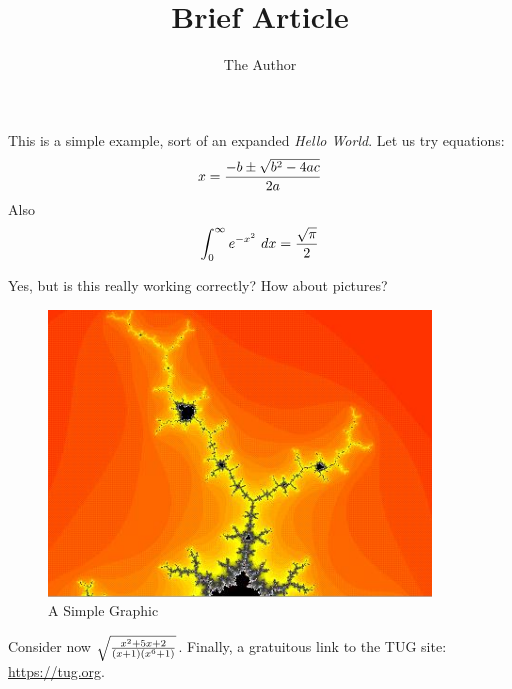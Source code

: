 \documentclass[11pt, oneside]{article}   	%
\title{Brief Article}
\author{The Author}
\begin{document}
\maketitle
This is a simple example, sort of an expanded {\em Hello World}.
Let us try equations: 
$$x = {{- b \pm \sqrt{b^2 - 4 ac}} \over {2a}}$$
Also
$$\int_0^\infty e^{- x^2} \ dx = {{\sqrt{\pi}} \over 2}$$

Yes, but is this really working correctly? How about pictures?

\begin{figure}[htbp] %
   \centering
   \includegraphics[width=4in]{topdot.jpg} 
   \caption{A Simple Graphic}
\end{figure}

Consider now $\sqrt{ {{x^2 + 5 x + 2} \over {(x + 1)(x^6 + 1)}}}$.  Finally, a gratuitous link to the TUG site: \url{https://tug.org}.
\end{document}
